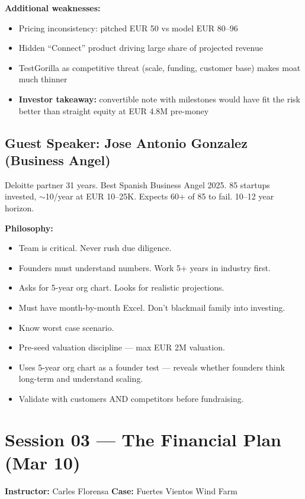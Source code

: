 \documentclass[a4paper,11pt]{article}
\begin{document}
\textbf{Additional weaknesses:}
\begin{itemize}
\item Pricing inconsistency: pitched EUR 50 vs model EUR 80--96
\item Hidden ``Connect'' product driving large share of projected revenue
\item TestGorilla as competitive threat (scale, funding, customer base) makes moat much thinner
\item \textbf{Investor takeaway:} convertible note with milestones would have fit the risk better than straight equity at EUR 4.8M pre-money
\end{itemize}

\subsection{Guest Speaker: Jose Antonio Gonzalez (Business Angel)}

Deloitte partner 31 years. Best Spanish Business Angel 2025. 85 startups invested, $\sim$10/year at EUR 10--25K. Expects 60+ of 85 to fail. 10--12 year horizon.

\textbf{Philosophy:}
\begin{itemize}
\item Team is critical. Never rush due diligence.
\item Founders must understand numbers. Work 5+ years in industry first.
\item Asks for 5-year org chart. Looks for realistic projections.
\item Must have month-by-month Excel. Don't blackmail family into investing.
\item Know worst case scenario.
\item Pre-seed valuation discipline --- max EUR 2M valuation.
\item Uses 5-year org chart as a founder test --- reveals whether founders think long-term and understand scaling.
\item Validate with customers AND competitors before fundraising.
\end{itemize}

\newpage

\section{Session 03 --- The Financial Plan (Mar 10)}
\textbf{Instructor:} Carles Florensa \hfill \textbf{Case:} Fuertes Vientos Wind Farm
\end{document}
